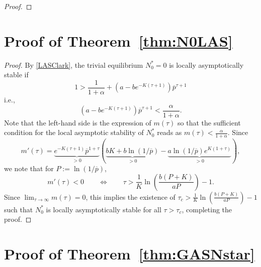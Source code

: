 \documentclass{article}
\newtheorem{theorem}{Theorem}
\numberwithin{theorem}{section}
\begin{document}
{\begin{proof}
\end{proof}

\section{Proof of Theorem~\ref{thm:N0LAS}}\label{A:thmN0LAS}

\begin{proof}

By \eqref{LASClark}, the trivial equilibrium $N^*_0=0$ is locally asymptotically stable if 
$$1>
\frac{1}{1+\alpha}+\left(a - b e^{-K(\tau+1)}\right)
\overline{p}^{\tau+1}$$
i.e., 
\begin{equation}\label{condN0}
\left(a - b e^{-K(\tau+1)}\right)
\overline{p}^{\tau+1}<\frac{\alpha}{1+\alpha}.
\end{equation}
Note that the left-hand side is the expression of $m(\tau)$ so that the sufficient condition for the local asymptotic stability of $N^*_0$ reads as $m(\tau)<\frac{\alpha}{1+\alpha}$. 
Since 
$$m'(\tau)=\underbrace{e^{-K(\tau+1)}\overline{p}^{ 1 + \tau}}_{>0} (\underbrace{b K+b\ln(1/\overline{p})}_{>0} -\underbrace{a\ln(1/\overline{p}) e^{K (1 + \tau)}}_{>0}),$$
we note that for $P:=\ln(1/\overline{p})$, 
$$m'(\tau)<0 \qquad \iff \qquad  \tau> \frac{1}{K}\ln\left(\frac{b(P+K)}{aP}\right) -1.$$
Since $\lim_{\tau\to \infty}m(\tau)=0$, this implies the existence of $\tau_c> \frac{1}{K}\ln\left(\frac{b(P+K)}{aP}\right) -1$ such that $N^*_0$ is locally asymptotically stable for all $\tau>\tau_c$, completing the proof.
\end{proof}



\section{Proof of Theorem~\ref{thm:GASNstar}}\label{A:GASNstarR}


}
\end{document}
